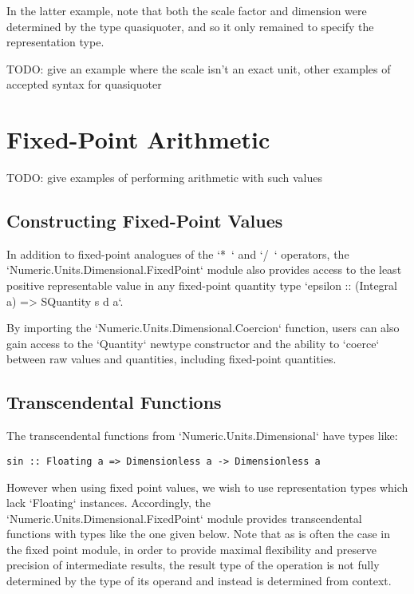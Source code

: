 \documentclass[11pt]{report}
\begin{document}
In the latter example, note that both the scale factor and dimension were determined by the type quasiquoter, and so it
only remained to specify the representation type.

TODO: give an example where the scale isn't an exact unit, other examples of accepted syntax for quasiquoter

\section{Fixed-Point Arithmetic}

TODO: give examples of performing arithmetic with such values

\subsection{Constructing Fixed-Point Values}

In addition to fixed-point analogues of the `*~` and `/~` operators, the `Numeric.Units.Dimensional.FixedPoint`
module also provides access to the least positive representable value in any fixed-point quantity type `epsilon :: (Integral a) => SQuantity s d a`.

By importing the `Numeric.Units.Dimensional.Coercion` function, users can also gain access to the `Quantity` newtype constructor
and the ability to `coerce` between raw values and quantities, including fixed-point quantities.

\subsection{Transcendental Functions}

The transcendental functions from `Numeric.Units.Dimensional` have types like:

\begin{lstlisting}
sin :: Floating a => Dimensionless a -> Dimensionless a
\end{lstlisting}

However when using fixed point values, we wish to use representation types which lack `Floating` instances. Accordingly,
the `Numeric.Units.Dimensional.FixedPoint` module provides transcendental functions with types like the one given below.
Note that as is often the case in the fixed point module, in order to provide maximal flexibility and preserve precision of
intermediate results, the result type of the operation is not fully determined by the type of its operand and instead is
determined from context.
\end{document}
